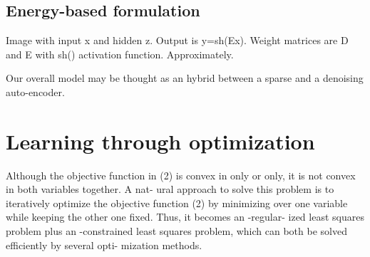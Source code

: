 \newpage
\section{Energy-based formulation} \label{sec:energy_formulation}


{\color{red} Image with input x and hidden z. Output is y=sh(Ex). Weight matrices are D and E with sh() activation function. Approximately.}


Our overall model may be thought as an hybrid between a sparse and a denoising auto-encoder.




\chapter{Learning through optimization} \label{chap:learning}

Although the objective function in (2) is convex in only
or only, it is not convex in both variables together. A nat-
ural approach to solve this problem is to iteratively optimize the
objective function (2) by minimizing over one variable while
keeping the other one fixed. Thus, it becomes an -regular-
ized least squares problem plus an -constrained least squares
problem, which can both be solved efficiently by several opti-
mization methods.

